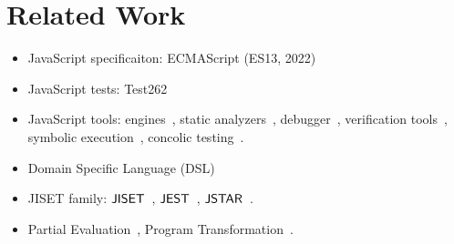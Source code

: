 \section{Related Work}\label{sec:related}

\begin{itemize}
  \item JavaScript specificaiton: ECMAScript (ES13, 2022)~\cite{es13}
  \item JavaScript tests: Test262~\cite{test262}
  \item JavaScript tools: engines~\cite{v8, jscore, chakra, spidermonkey},
    static analyzers~\cite{safe, safe2, tajs, wala, jsai},
    debugger~\cite{jsexplain}, verification tools~\cite{javert, javert2,
    ad-safety, javanni}, symbolic execution~\cite{symbolic-js, sym-js, expo-se},
    concolic testing~\cite{jalangi, type-conc-test}.
  \item Domain Specific Language (DSL)~\cite{dsl-survey, dsl-survey2}
  \item JISET family: $\jiset$~\cite{jiset}, $\jest$~\cite{jest}, $\jstar$~\cite{jstar}.
  \item Partial Evaluation~\cite{peval, peval-survey}, Program
    Transformation~\cite{trans-ai}.
\end{itemize}

\todo
